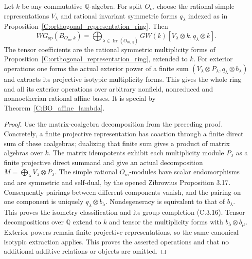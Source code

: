 \begin{proposition}
\label{C:BO_Qalgebra}
Let $k$ be any commutative $\mathbb Q$-algebra. For split $O_m$ choose
the rational simple representations $V_\lambda$ and rational invariant
symmetric forms $q_\lambda$ indexed as in
Proposition~\ref{C:orthogonal_representation_ring}. Then
\[
 WG_{\mathrm{sp}}(B_{O_m,k})
   =\bigoplus_{\lambda\in\operatorname{Irr}(O_{m,\mathbb Q})}
          GW(k)[V_\lambda\otimes k,q_\lambda\otimes k].          \tag{C.3.16}
\]
The tensor coefficients are the rational symmetric multiplicity forms
of Proposition~\ref{C:orthogonal_representation_ring}, extended to $k$.
For exterior operations one forms the actual exterior power of a finite
sum $(V_\lambda\otimes P_\lambda,q_\lambda\otimes b_\lambda)$ and
extracts its projective isotypic multiplicity forms. This gives the
whole ring and all its exterior operations over arbitrary nonfield,
nonreduced and nonnoetherian rational affine bases. It is special by
Theorem~\ref{C:BO_affine_lambda}.
\end{proposition}
\begin{proof}
Use the matrix-coalgebra decomposition from the preceding proof.
Concretely, a finite projective representation has coaction through a
finite direct sum of these coalgebras; dualizing that finite sum gives
a product of matrix algebras over $k$. The matrix idempotents exhibit
each multiplicity module $P_\lambda$ as a finite projective direct
summand and give an actual decomposition
$M=\bigoplus_\lambda V_\lambda\otimes P_\lambda$.
The simple rational $O_m$-modules have scalar endomorphisms and are
symmetric and self-dual, by the opened Zibrowius Proposition 3.17.
Consequently pairings between different components vanish, and the
pairing on one component is uniquely $q_\lambda\otimes b_\lambda$.
Nondegeneracy is equivalent to that of $b_\lambda$. This proves the
isometry classification and its group completion (C.3.16).
Tensor decompositions over $\mathbb Q$ extend to $k$ and tensor the
multiplicity forms with $b_\lambda\otimes b_\mu$. Exterior powers
remain finite projective representations, so the same canonical
isotypic extraction applies. This proves the asserted operations and
that no additional additive relations or objects are omitted.
\end{proof}

